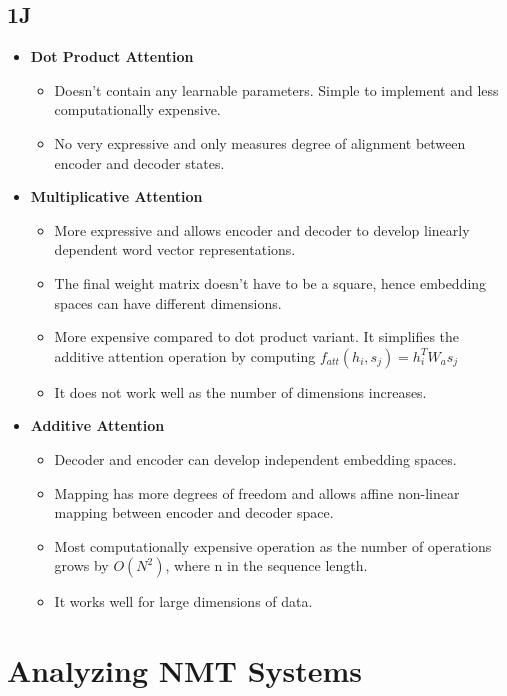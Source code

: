 \documentclass[a4paper]{article}
\begin{document}
\subsection{1J}
\begin{itemize}
    \item \textbf{Dot Product Attention}  
        \begin{itemize}
            \item Doesn't contain any learnable parameters. Simple to implement and less computationally expensive.
            \item No very expressive and only measures degree of alignment between encoder and decoder states.
        \end{itemize}
    \item \textbf{Multiplicative Attention} 
        \begin{itemize}
            \item More expressive and allows encoder and decoder to develop linearly dependent word vector representations.
            \item The final weight matrix doesn't have to be a square, hence embedding spaces can have different dimensions.
            \item More expensive compared to dot product variant. It simplifies the additive attention operation by computing
                $f_{att}(h_i, s_j) = h_i^TW_as_j$
            \item It does not work well as the number of dimensions increases.
        \end{itemize}
    \item \textbf{Additive Attention} 
        \begin{itemize}
            \item Decoder and encoder can develop independent embedding spaces.
            \item Mapping has more degrees of freedom and allows affine non-linear mapping between encoder and decoder space.
            \item Most computationally expensive operation as the number of operations grows by $O(N^2)$, where n in the sequence length.
            \item It works well for large dimensions of data.
        \end{itemize}
\end{itemize}
\section{Analyzing NMT Systems}
\end{document}
